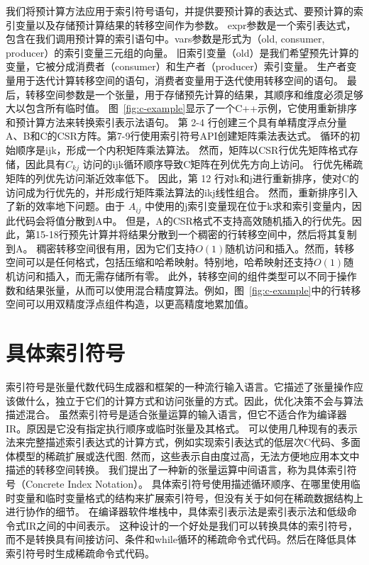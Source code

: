 \begin{translation}
我们将预计算方法应用于索引符号语句，并提供要预计算的表达式、要预计算的索引变量以及存储预计算结果的转移空间作为参数。 
expr参数是一个索引表达式，包含在我们调用预计算的索引语句中。vars参数是形式为（old, consumer, producer）的索引变量三元组的向量。 
旧索引变量（old）是我们希望预先计算的变量，它被分成消费者（consumer）和生产者（producer）索引变量。 
生产者变量用于迭代计算转移空间的语句，消费者变量用于迭代使用转移空间的语句。 
最后，转移空间参数是一个张量，用于存储预先计算的结果，其顺序和维度必须足够大以包含所有临时值。
图~\ref{fig:c-example}显示了一个C++示例，它使用重新排序和预计算方法来转换索引表示法语句。
第 2-4 行创建三个具有单精度浮点分量A、B和C的CSR方阵。第7-9行使用索引符号API创建矩阵乘法表达式。
循环的初始顺序是ijk，形成一个内积矩阵乘法算法。 然而，矩阵以CSR行优先矩阵格式存储，因此具有$ C_{kj}$ 访问的ijk循环顺序导致C矩阵在列优先方向上访问。
行优先稀疏矩阵的列优先访问渐近效率低下。 因此，第 12 行对k和j进行重新排序，使对C的访问成为行优先的，并形成行矩阵乘法算法的ikj线性组合。 
然而，重新排序引入了新的效率地下问题。由于 $ A_{ij} $ 中使用的j索引变量现在位于k求和索引变量内，因此代码会将值分散到A中。
但是，A的CSR格式不支持高效随机插入的行优先。因此，第15-18行预先计算并将结果分散到一个稠密的行转移空间中，然后将其复制到A。
稠密转移空间很有用，因为它们支持$ O(1) $随机访问和插入。然而，转移空间可以是任何格式，包括压缩和哈希映射。特别地，哈希映射还支持$ O(1) $随机访问和插入，而无需存储所有零。
此外，转移空间的组件类型可以不同于操作数和结果张量，从而可以使用混合精度算法。例如，图~\ref{fig:c-example}中的行转移空间可以用双精度浮点组件构造，以更高精度地累加值。

\section{具体索引符号}
索引符号是张量代数代码生成器和框架的一种流行输入语言。它描述了张量操作应该做什么，独立于它们的计算方式和访问张量的方式。因此，优化决策不会与算法描述混合。
虽然索引符号是适合张量运算的输入语言，但它不适合作为编译器IR。原因是它没有指定执行顺序或临时张量及其格式。
可以使用几种现有的表示法来完整描述索引表达式的计算方式，例如实现索引表达式的低层次C代码、多面体模型的稀疏扩展或迭代图. 
然而，这些表示自由度过高，无法方便地应用本文中描述的转移空间转换。
我们提出了一种新的张量运算中间语言，称为具体索引符号（Concrete Index Notation）。
具体索引符号使用描述循环顺序、在哪里使用临时变量和临时变量格式的结构来扩展索引符号，但没有关于如何在稀疏数据结构上进行协作的细节。
在编译器软件堆栈中，具体索引表示法是索引表示法和低级命令式IR之间的中间表示。
这种设计的一个好处是我们可以转换具体的索引符号，而不是转换具有间接访问、条件和while循环的稀疏命令式代码。然后在降低具体索引符号时生成稀疏命令式代码。


\end{translation}
